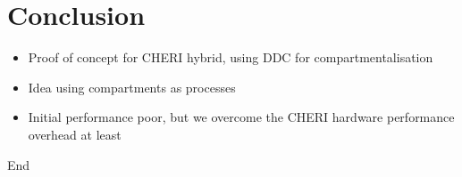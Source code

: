 \section{Conclusion}
\begin{itemize}
    \item Proof of concept for CHERI hybrid, using DDC for compartmentalisation
    \item Idea using compartments as processes
    \item Initial performance poor, but we overcome the CHERI hardware performance overhead at least
\end{itemize}
End\cite{sison95simultaneous}





